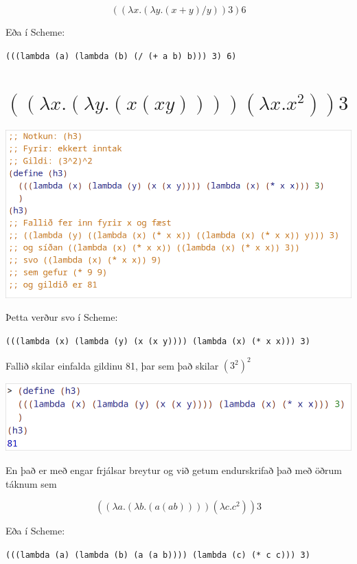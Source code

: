 \documentclass{article}
\begin{document}
	\[((\lambda x.(\lambda y.(x + y) / y)) 3) 6\]

	Eða í Scheme:

	\begin{center}
		\texttt{(((lambda (a) (lambda (b) (/ (+ a b) b))) 3) 6)}
	\end{center}

	\newpage
	\section{$((\lambda x.(\lambda y.(x(xy))))(\lambda x.x^2)) 3$}
	\includegraphics[scale=0.3]{h3.png}

	Þetta verður svo í Scheme: 

	\begin{center}\texttt{(((lambda (x) (lambda (y) 
	(x (x y)))) (lambda (x) (* x x))) 3)}\end{center}

	Fallið skilar einfalda gildinu 81, þar sem það skilar $(3^2)^2$

	\begin{center}
		\includegraphics[scale=0.375]{81.png}
	\end{center}

	En það er með engar frjálsar breytur og 
	við getum endurskrifað það með öðrum táknum sem

	\[((\lambda a.(\lambda b.(a(a b)))) (\lambda c.c^2))3\]

	Eða í Scheme:

	\begin{center}
		\texttt{(((lambda (a) (lambda (b) (a (a b)))) (lambda (c) 
		(* c c))) 3)}
	\end{center}
\end{document}
